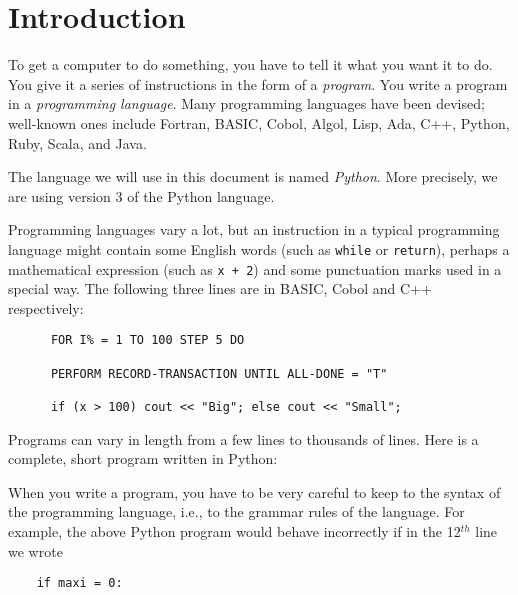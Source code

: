 \section{Introduction}


To get a computer to do something, you have to tell it what you want it
to do.  You give it a series of instructions in the form of a \emph{program}.
You write a program in a \emph{programming language}.
Many programming languages have been devised; well-known ones include
Fortran, BASIC, Cobol, Algol, Lisp, Ada, C++, Python, Ruby, Scala, and Java.


The language we will use in this document is named \emph{Python}.
More precisely, we are using version 3 of the Python language.

Programming languages vary a lot, but
an instruction in a typical programming language might contain
some English words (such as \verb!while! or \verb!return!), perhaps a mathematical
expression (such as \verb!x + 2!) and some punctuation marks used in a special way.
The following three lines are in BASIC, Cobol and C++ respectively:
\begin{Verbatim}
      FOR I% = 1 TO 100 STEP 5 DO

      PERFORM RECORD-TRANSACTION UNTIL ALL-DONE = "T"

      if (x > 100) cout << "Big"; else cout << "Small";
\end{Verbatim}

Programs can vary in length from a few lines to thousands of lines.
Here is a complete, short program written in Python:


When you write a program, you have to be very careful to keep to the
syntax of the programming language, i.e., to the grammar rules of the language.
For example, the above Python program would
behave incorrectly if in the 12$^{th}$ line we wrote
\pagebreak

\begin{Verbatim}
    if maxi = 0:
\end{Verbatim}

